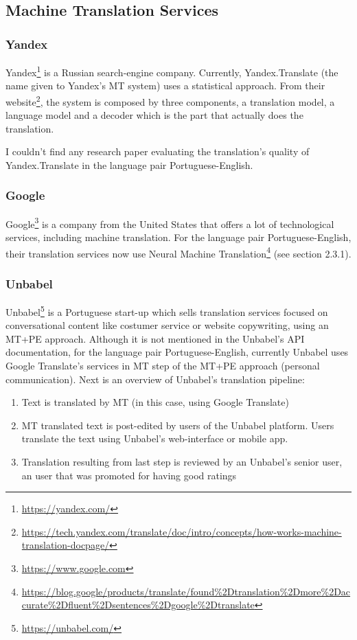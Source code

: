 \subsection{Machine Translation Services}

\subsubsection{Yandex}

Yandex\footnote{\url{https://yandex.com/}} is a Russian search-engine company. Currently, Yandex.Translate (the name given to Yandex's MT system) uses a statistical approach. From their website\footnote{\url{https://tech.yandex.com/translate/doc/intro/concepts/how-works-machine-translation-docpage/}}, the system is composed by three components, a translation model, a language model and a decoder which is the part that actually does the translation.

I couldn't find any research paper evaluating the translation's quality of Yandex.Translate in the language pair Portuguese-English.

\subsubsection{Google}

Google\footnote{\url{https://www.google.com}} is a company from the United States that offers a lot of technological services, including machine translation. For the language pair Portuguese-English, their translation services now use Neural Machine Translation\footnote{\url{https://blog.google/products/translate/found\%2Dtranslation\%2Dmore\%2Daccurate\%2Dfluent\%2Dsentences\%2Dgoogle\%2Dtranslate}} (see section 2.3.1).

\subsubsection{Unbabel}

Unbabel\footnote{\url{https://unbabel.com/}} is a Portuguese start-up which sells translation services focused on conversational content like costumer service or website copywriting, using an MT+PE approach. Although it is not mentioned in the Unbabel's API documentation, for the language pair Portuguese-English, currently Unbabel uses Google Translate's services in MT step of the MT+PE approach (personal communication). Next is an overview of Unbabel's translation pipeline:

\begin{enumerate}
\item Text is translated by MT (in this case, using Google Translate)
\item MT translated text is post-edited by users of the Unbabel platform. Users translate the text using Unbabel's web-interface or mobile app.
\item Translation resulting from last step is reviewed by an Unbabel's senior user, an user that was promoted for having good ratings
\end{enumerate}

